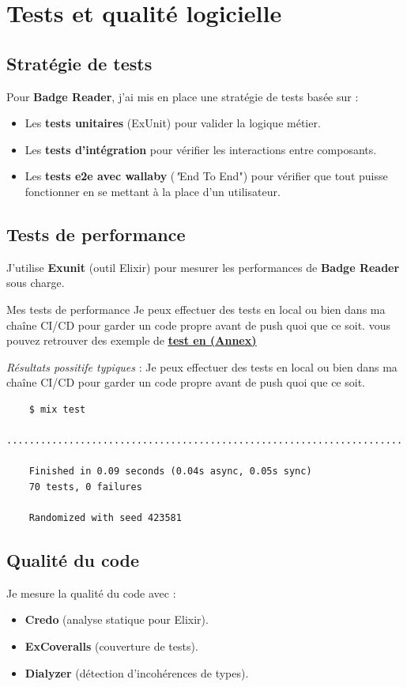 \chapter{Tests et qualité logicielle}

\section{Stratégie de tests}
Pour \textbf{Badge Reader}, j’ai mis en place une stratégie de tests basée sur :
\begin{itemize}
    \item Les \textbf{tests unitaires} (ExUnit) pour valider la logique métier.
    \item Les \textbf{tests d’intégration} pour vérifier les interactions entre composants.
    \item Les \textbf{tests e2e avec wallaby} (\textit"End To End") pour vérifier que tout puisse fonctionner en se mettant à la place d'un utilisateur.
\end{itemize}

\section{Tests de performance}
J’utilise \textbf{Exunit} (outil Elixir) pour mesurer les performances de \textbf{Badge Reader} sous charge. \newline


\begin{for_you}{Mes tests de performance}
    Je peux effectuer des tests en local ou bien dans ma chaîne CI/CD pour garder un code propre avant de push quoi que ce soit.
    vous pouvez retrouver des exemple de \hyperlink{cible:test}{\underline{\textbf{test en (Annex)}}} \newline

    \textit{Résultats possitife typiques} :
    Je peux effectuer des tests en local ou bien dans ma chaîne CI/CD pour garder un code propre avant de push quoi que ce soit.
    \begin{lstlisting}
    $ mix test
    ......................................................................

    Finished in 0.09 seconds (0.04s async, 0.05s sync)
    70 tests, 0 failures

    Randomized with seed 423581
    \end{lstlisting}
\end{for_you}

\section{Qualité du code}
Je mesure la qualité du code avec :
\begin{itemize}
    \item \textbf{Credo} (analyse statique pour Elixir).
    \item \textbf{ExCoveralls} (couverture de tests).
    \item \textbf{Dialyzer} (détection d’incohérences de types).
\end{itemize}

